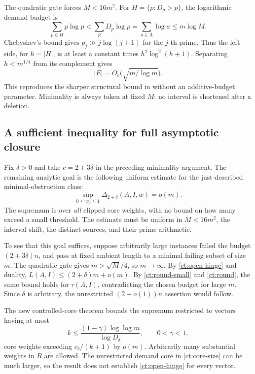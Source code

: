 The quadratic gate forces \(M<16m^2\). For
\(H=\{p:D_p>p\}\), the logarithmic demand budget is
\[
 \sum_{p\in H}p\log p
 <\sum_pD_p\log p
 =\sum_{a\in A}\log a
 \le m\log M.
\]
Chebyshev's bound gives \(p_j\gg j\log(j+1)\) for the
\(j\)-th prime. Thus the left side, for \(h=|H|\), is at least
a constant times \(h^2\log^2(h+1)\). Separating
\(h<m^{1/4}\) from its complement gives
\begin{equation}
 |E|=O_c\bigl(\sqrt{m/\log m}\bigr).
 \label{ct:core-size}
\end{equation}
This reproduces the sharper structural bound in \cite{Synthesis}
without an additive-budget parameter. Minimality is always taken
at fixed \(M\); no interval is shortened after a deletion.

\subsection{A sufficient inequality for full asymptotic closure}

Fix \(\delta>0\) and take \(c=2+3\delta\) in the preceding
minimality argument. The remaining analytic goal is the following
uniform estimate for the just-described minimal-obstruction class:
\begin{equation}
 \boxed{\quad
 \sup_{0\le w_p\le1}\Delta_{2+\delta}(A,I,w)=o(m).
 \quad}
 \label{ct:open-hinge}
\end{equation}
The supremum is over \emph{all} clipped core weights, with no
bound on how many exceed a small threshold. The estimate must be
uniform in \(M<16m^2\), the interval shift, the distinct sources,
and their prime arithmetic.

To see that this goal suffices, suppose arbitrarily large instances
failed the budget \((2+3\delta)n\), and pass at fixed ambient
length to a minimal failing subset of size \(m\). The quadratic
gate gives \(m>\sqrt M/4\), so \(m\to\infty\). By
\eqref{ct:open-hinge} and duality,
\(L(A,I)\le(2+\delta)m+o(m)\). By
\eqref{ct:round-small} and \eqref{ct:round}, the same bound holds
for \(\tau(A,I)\), contradicting the chosen budget for large
\(m\). Since \(\delta\) is arbitrary, the unrestricted
\((2+o(1))n\) assertion would follow.

The new controlled-core theorem bounds the supremum restricted to
vectors having at most
\[
 k\le \frac{(1-\gamma)\log\log m}{\log D_\delta},
 \qquad 0<\gamma<1,
\]
core weights exceeding \(c_\delta/(k+1)\) by \(o(m)\). Arbitrarily many
substantial weights in \(R\) are allowed. The unrestricted demand
core in \eqref{ct:core-size} can be much larger, so the result
does not establish \eqref{ct:open-hinge} for every vector.


